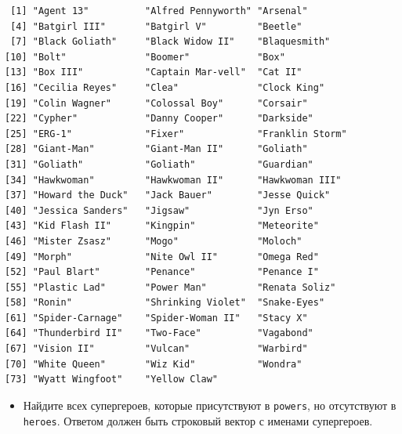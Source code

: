 \documentclass[
]{book}
\newenvironment{Shaded}{\begin{snugshade}}{\end{snugshade}}
\newcommand{\DataTypeTok}[1]{\textcolor[rgb]{0.13,0.29,0.53}{#1}}
\newcommand{\KeywordTok}[1]{\textcolor[rgb]{0.13,0.29,0.53}{\textbf{#1}}}
\newcommand{\NormalTok}[1]{#1}
\newcommand{\OperatorTok}[1]{\textcolor[rgb]{0.81,0.36,0.00}{\textbf{#1}}}
\newcommand{\StringTok}[1]{\textcolor[rgb]{0.31,0.60,0.02}{#1}}
\providecommand{\tightlist}{%
  \setlength{\itemsep}{0pt}\setlength{\parskip}{0pt}}
\begin{document}
\begin{verbatim}
 [1] "Agent 13"          "Alfred Pennyworth" "Arsenal"          
 [4] "Batgirl III"       "Batgirl V"         "Beetle"           
 [7] "Black Goliath"     "Black Widow II"    "Blaquesmith"      
[10] "Bolt"              "Boomer"            "Box"              
[13] "Box III"           "Captain Mar-vell"  "Cat II"           
[16] "Cecilia Reyes"     "Clea"              "Clock King"       
[19] "Colin Wagner"      "Colossal Boy"      "Corsair"          
[22] "Cypher"            "Danny Cooper"      "Darkside"         
[25] "ERG-1"             "Fixer"             "Franklin Storm"   
[28] "Giant-Man"         "Giant-Man II"      "Goliath"          
[31] "Goliath"           "Goliath"           "Guardian"         
[34] "Hawkwoman"         "Hawkwoman II"      "Hawkwoman III"    
[37] "Howard the Duck"   "Jack Bauer"        "Jesse Quick"      
[40] "Jessica Sanders"   "Jigsaw"            "Jyn Erso"         
[43] "Kid Flash II"      "Kingpin"           "Meteorite"        
[46] "Mister Zsasz"      "Mogo"              "Moloch"           
[49] "Morph"             "Nite Owl II"       "Omega Red"        
[52] "Paul Blart"        "Penance"           "Penance I"        
[55] "Plastic Lad"       "Power Man"         "Renata Soliz"     
[58] "Ronin"             "Shrinking Violet"  "Snake-Eyes"       
[61] "Spider-Carnage"    "Spider-Woman II"   "Stacy X"          
[64] "Thunderbird II"    "Two-Face"          "Vagabond"         
[67] "Vision II"         "Vulcan"            "Warbird"          
[70] "White Queen"       "Wiz Kid"           "Wondra"           
[73] "Wyatt Wingfoot"    "Yellow Claw"      
\end{verbatim}

\begin{itemize}
\tightlist
\item
  Найдите всех супергероев, которые присутствуют в \texttt{powers}, но отсутствуют в \texttt{heroes}. Ответом должен быть строковый вектор с именами супергероев.
\end{itemize}

\begin{Shaded}
\end{Shaded}
\end{document}
